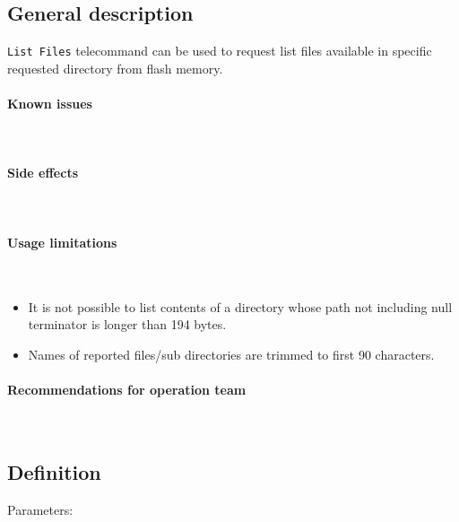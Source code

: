 

\subsection{General description}
\texttt{List Files} telecommand can be used to request list files available in specific requested directory 
from flash memory. 

\paragraph{Known issues} \mbox{} \\
\None

\paragraph{Side effects} \mbox{} \\
\None

\paragraph{Usage limitations} \mbox{} \\
\begin{itemize}
    \item It is not possible to list contents of a directory whose path not including null terminator is longer than 194 bytes.
    \item Names of reported files/sub directories are trimmed to first 90 characters.
\end{itemize}

\paragraph{Recommendations for operation team} \mbox{} \\
\None

\subsection{Definition}

Parameters: 

\begin{tcarglist}
\end{tcarglist}

